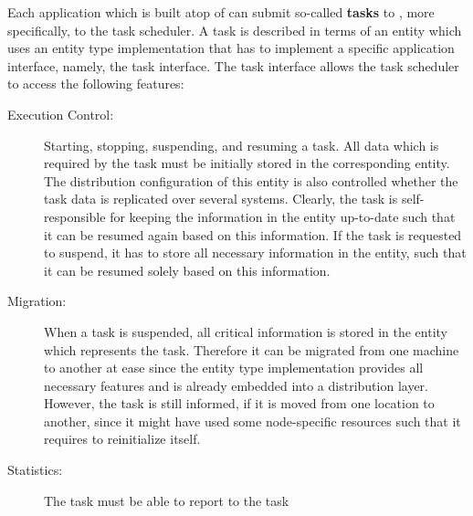 \documentclass[a4paper, 10pt]{book}
\begin{document}
                                Each application which is built atop of \SYNEIGHT can submit so-called
                                \textbf{tasks} to \SYNEIGHT, more specifically, to the task scheduler. A
                                task is described in terms of an entity which uses an entity type
                                implementation that has to implement a specific application interface,
                                namely, the task interface. The task interface allows the task
                                scheduler to access the following features:
                                \begin{description}
                                    \item[Execution Control:] Starting, stopping, suspending, and resuming
                                        a task. All data which is required by the task must be initially
                                        stored in the corresponding entity. The distribution configuration
                                        of this entity is also controlled whether the task data is
                                        replicated over several systems. Clearly, the task is
                                        self-responsible for keeping the information in the entity
                                        up-to-date such that it can be resumed again based on this
                                        information. If the task is requested to suspend, it has to store
                                        all necessary information in the entity, such that it can be resumed
                                        solely based on this information. 
                                    \item[Migration:] When a task is suspended, all critical information
                                        is stored in the entity which represents the task. Therefore it can
                                        be migrated from one machine to another at ease since the entity
                                        type implementation provides all necessary features and is already
                                        embedded into a distribution layer. However, the task is still
                                        informed, if it is moved from one location to another, since it
                                        might have used some node-specific resources such that it requires
                                        to reinitialize itself. 
                                    \item[Statistics:] The task must be able to report to the task

\end{description}
\end{document}
